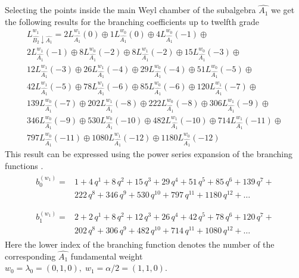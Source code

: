 \documentclass[a4paper,12pt]{article}
\theoremstyle{definition} \newtheorem{Def}{Definition}
\begin{document}
Selecting the points inside the main Weyl chamber of the subalgebra $\hat{A_1}$ we get the following results for the branching coefficients up to twelfth grade
\begin{multline}
  \label{eq:28}
  L^{w_1}_{\hat{B_2}\downarrow \hat{A_1}}=2 L_{\hat{A_1}}^{w_1}(0)\oplus 1 L_{\hat{A_1}}^{w_0}(0)\oplus 4 L_{\hat{A_1}}^{w_0}(-1)\oplus\\
    2 L_{\hat{A_1}}^{w_1}(-1)\oplus 8 L_{\hat{A_1}}^{w_0}(-2)\oplus
    8 L_{\hat{A_1}}^{w_1}(-2)\oplus 15 L_{\hat{A_1}}^{w_0}(-3)\oplus\\
    12 L_{\hat{A_1}}^{w_1}(-3)\oplus 26 L_{\hat{A_1}}^{w_1}(-4)\oplus
    29 L_{\hat{A_1}}^{w_0}(-4)\oplus 51 L_{\hat{A_1}}^{w_0}(-5)\oplus\\
    42 L_{\hat{A_1}}^{w_1}(-5)\oplus 78 L_{\hat{A_1}}^{w_1}(-6)\oplus
    85 L_{\hat{A_1}}^{w_0}(-6)\oplus 120 L_{\hat{A_1}}^{w_1}(-7)\oplus\\
    139 L_{\hat{A_1}}^{w_0}(-7)\oplus 202 L_{\hat{A_1}}^{w_1}(-8)\oplus
    222 L_{\hat{A_1}}^{w_0}(-8)\oplus 306 L_{\hat{A_1}}^{w_1}(-9)\oplus\\
    346 L_{\hat{A_1}}^{w_0}(-9)\oplus 530 L_{\hat{A_1}}^{w_0}(-10)\oplus
    482 L_{\hat{A_1}}^{w_1}(-10)\oplus 714 L_{\hat{A_1}}^{w_1}(-11)\oplus\\
    797 L_{\hat{A_1}}^{w_0}(-11)\oplus 1080 L_{\hat{A_1}}^{w_1}(-12)\oplus
    1180 L_{\hat{A_1}}^{w_0}(-12)
\end{multline}
This result can be expressed using the power series expansion of the branching functions \cite{kac1990idl}.
\begin{eqnarray}
  \label{eq:29}
  \begin{array}{cc}
    b^{(w_1)}_{0}= & 1 + 4\,q^{1}+ 8\,q^{2}+ 15\,q^{3}+ 29\,q^{4}+ 51\,q^{5}+ 85\,q^{6}+ 139\,q^{7}+\\
     &222\,q^{8}+ 346\,q^{9}+ 530\,q^{10}+ 797\,q^{11}+ 1180\,q^{12}+\dots\\
  \end{array}\\
  \begin{array}{cc}
    b^{(w_1)}_{1}= &2+2\,q^{1}+8\,q^{2}+12\,q^{3}+26\,q^{4}+42\,q^{5}+78\,q^{6}+120\,q^{7}+\\
    & 202\,q^{8}+306\,q^{9}+482\,q^{10}+714\,q^{11}+1080\,q^{12}+\dots
  \end{array}
\end{eqnarray}
Here the lower index of the branching function denotes the number of the corresponding $\hat{A_1}$ fundamental weight $w_0=\lambda_0=(0,1,0),\; w_1=\alpha/2=(1,1,0)$.
\end{document}
